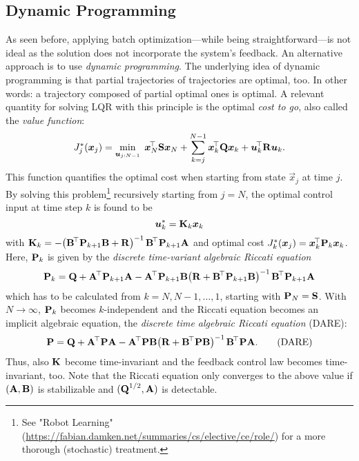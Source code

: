 		\subsection{Dynamic Programming}
			As seen before, applying batch optimization---while being straightforward---is not ideal as the solution does not incorporate the system's feedback. An alternative approach is to use \emph{dynamic programming}. The underlying idea of dynamic programming is that partial trajectories of trajectories are optimal, too. In other words: a trajectory composed of partial optimal ones is optimal. A relevant quantity for solving LQR with this principle is the optimal \emph{cost to go}, also called the \emph{value function}:
			\begin{equation}
				J_j^\ast(\bm{x}_j) = \min_{\bm{u}_{j:N - 1}}\; \bm{x}_N^{\!\top} \bm{\mathrm{S}} \bm{x}_N + \sum_{k = j}^{N - 1} \bm{x}_k^{\!\top} \bm{\mathrm{Q}} \bm{x}_k + \bm{u}_k^{\!\top} \bm{\mathrm{R}} \bm{u}_k.
			\end{equation}
			This function quantifies the optimal cost when starting from state \(\vec{x}_j\) at time \(j\). By solving this problem\footnote{See "Robot Learning" (\url{https://fabian.damken.net/summaries/cs/elective/ce/role/}) for a more thorough (stochastic) treatment.} recursively starting from \(j = N\), the optimal control input at time step \(k\) is found to be
			\begin{equation}
				\bm{u}_k^\ast = \bm{\mathrm{K}}_k \bm{x}_k
			\end{equation}
			with \( \bm{\mathrm{K}}_k = -\bigl( \bm{\mathrm{B}}^{\!\top} \bm{\mathrm{P}}_{k + 1} \bm{\mathrm{B}} + \bm{\mathrm{R}} \bigr)^{-1\,} \bm{\mathrm{B}}^{\!\top} \bm{\mathrm{P}}_{k + 1} \bm{\mathrm{A}} \) and optimal cost \( J_k^\ast(\bm{x}_j) = \bm{x}_k^{\!\top} \bm{\mathrm{P}}_k \bm{x}_k \). Here, \( \bm{\mathrm{P}}_k \) is given by the \emph{discrete time-variant algebraic Riccati equation}
			\begin{equation}
				\bm{\mathrm{P}}_k = \bm{\mathrm{Q}} + \bm{\mathrm{A}}^{\!\top} \bm{\mathrm{P}}_{k + 1} \bm{\mathrm{A}} - \bm{\mathrm{A}}^{\!\top} \bm{\mathrm{P}}_{k + 1} \bm{\mathrm{B}} \bigl( \bm{\mathrm{R}} + \bm{\mathrm{B}}^{\!\top} \bm{\mathrm{P}}_{k + 1} \bm{\mathrm{B}} \bigr)^{-1\,} \bm{\mathrm{B}}^{\!\top} \bm{\mathrm{P}}_{k + 1} \bm{\mathrm{A}}
			\end{equation}
			which has to be calculated from \( k = N, N - 1, \dots, 1 \), starting with \( \bm{\mathrm{P}}_N = \bm{\mathrm{S}} \). With \(N \to \infty\), \(\bm{\mathrm{P}}_k\) becomes \(k\)-independent and the Riccati equation becomes an implicit algebraic equation, the \emph{discrete time algebraic Riccati equation} (DARE):
			\begin{equation}
				\bm{\mathrm{P}} = \bm{\mathrm{Q}} + \bm{\mathrm{A}}^{\!\top} \bm{\mathrm{P}} \bm{\mathrm{A}} - \bm{\mathrm{A}}^{\!\top} \bm{\mathrm{P}} \bm{\mathrm{B}} \bigl( \bm{\mathrm{R}} + \bm{\mathrm{B}}^{\!\top} \bm{\mathrm{P}} \bm{\mathrm{B}} \bigr)^{-1\,} \bm{\mathrm{B}}^{\!\top} \bm{\mathrm{P}} \bm{\mathrm{A}}.  \tag{DARE}
			\end{equation}
			Thus, also \(\bm{\mathrm{K}}\) become time-invariant and the feedback control law becomes time-invariant, too. Note that the Riccati equation only converges to the above value if \( (\bm{\mathrm{A}}, \bm{\mathrm{B}}) \) is stabilizable and \( (\bm{\mathrm{Q}}^{1/2}, \bm{\mathrm{A}}) \) is detectable.

